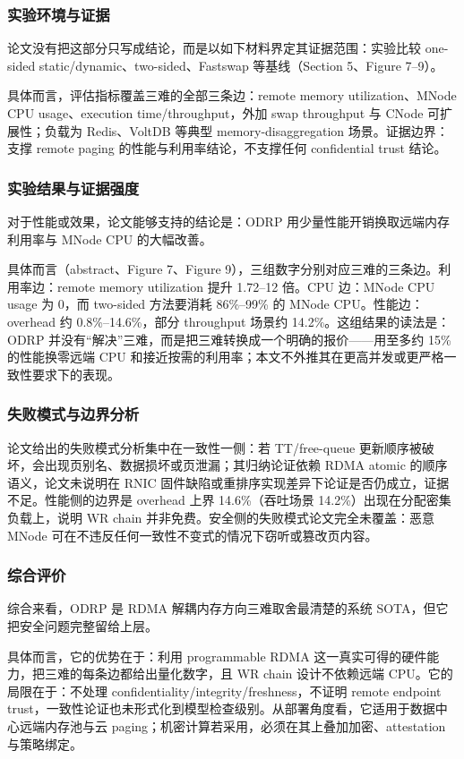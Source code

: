 \documentclass[11pt]{ctexart}
\begin{document}
\subsubsection{实验环境与证据}
论文没有把这部分只写成结论，而是以如下材料界定其证据范围：实验比较 one-sided static/dynamic、two-sided、Fastswap 等基线（Section 5、Figure 7--9）。\par
具体而言，评估指标覆盖三难的全部三条边：remote memory utilization、MNode CPU usage、execution time/throughput，外加 swap throughput 与 CNode 可扩展性；负载为 Redis、VoltDB 等典型 memory-disaggregation 场景。证据边界：支撑 remote paging 的性能与利用率结论，不支撑任何 confidential trust 结论。\par
\subsubsection{实验结果与证据强度}
对于性能或效果，论文能够支持的结论是：ODRP 用少量性能开销换取远端内存利用率与 MNode CPU 的大幅改善。\par
具体而言（abstract、Figure 7、Figure 9），三组数字分别对应三难的三条边。利用率边：remote memory utilization 提升 1.72--12 倍。CPU 边：MNode CPU usage 为 0，而 two-sided 方法要消耗 86\%--99\% 的 MNode CPU。性能边：overhead 约 0.8\%--14.6\%，部分 throughput 场景约 14.2\%。这组结果的读法是：ODRP 并没有“解决”三难，而是把三难转换成一个明确的报价——用至多约 15\% 的性能换零远端 CPU 和接近按需的利用率；本文不外推其在更高并发或更严格一致性要求下的表现。\par
\subsubsection{失败模式与边界分析}
论文给出的失败模式分析集中在一致性一侧：若 TT/free-queue 更新顺序被破坏，会出现页别名、数据损坏或页泄漏；其归纳论证依赖 RDMA atomic 的顺序语义，论文未说明在 RNIC 固件缺陷或重排序实现差异下论证是否仍成立，证据不足。性能侧的边界是 overhead 上界 14.6\%（吞吐场景 14.2\%）出现在分配密集负载上，说明 WR chain 并非免费。安全侧的失败模式论文完全未覆盖：恶意 MNode 可在不违反任何一致性不变式的情况下窃听或篡改页内容。\par
\subsubsection{综合评价}
综合来看，ODRP 是 RDMA 解耦内存方向三难取舍最清楚的系统 SOTA，但它把安全问题完整留给上层。\par
具体而言，它的优势在于：利用 programmable RDMA 这一真实可得的硬件能力，把三难的每条边都给出量化数字，且 WR chain 设计不依赖远端 CPU。它的局限在于：不处理 confidentiality/integrity/freshness，不证明 remote endpoint trust，一致性论证也未形式化到模型检查级别。从部署角度看，它适用于数据中心远端内存池与云 paging；机密计算若采用，必须在其上叠加加密、attestation 与策略绑定。\par
\end{document}
